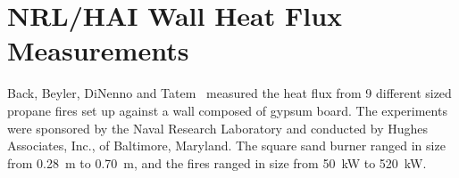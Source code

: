 %
%
%
%
%


\section{NRL/HAI Wall Heat Flux Measurements}

Back, Beyler, DiNenno and Tatem~\cite{Back:IAFSS4} measured the heat flux from 9 different sized propane fires set up against a wall composed
of gypsum board. The experiments were sponsored by the Naval Research Laboratory and conducted by Hughes Associates, Inc., of Baltimore, Maryland. The
square sand burner ranged in size from 0.28~m to 0.70~m, and the fires ranged in size from 50~kW to 520~kW.


